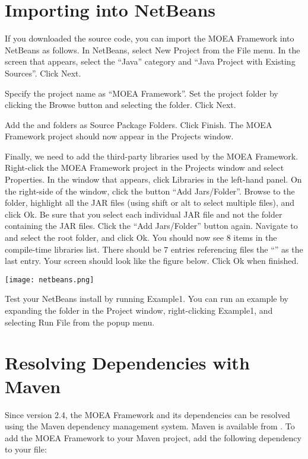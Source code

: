 \section{Importing into NetBeans}
If you downloaded the source code, you can import the MOEA Framework into NetBeans as follows.  In NetBeans, select New Project from the File menu.  In the screen that appears, select the ``Java'' category and ``Java Project with Existing Sources''.  Click Next.

Specify the project name as ``MOEA Framework''.  Set the project folder by clicking the Browse button and selecting the \folder{\moeaframework} folder.  Click Next.

Add the  and  folders as Source Package Folders.  Click Finish.  The MOEA Framework project should now appear in the Projects window.

Finally, we need to add the third-party libraries used by the MOEA Framework.  Right-click the MOEA Framework project in the Projects window and select Properties.  In the window that appears, click Libraries in the left-hand panel.  On the right-side of the window, click the button ``Add Jars/Folder''.  Browse to the  folder, highlight all the JAR files (using shift or alt to select multiple files), and click Ok.  Be sure that you select each individual JAR file and not the folder containing the JAR files.  Click the ``Add Jars/Folder'' button again.  Navigate to and select the root \folder{\moeaframework} folder, and click Ok.  You should now see $8$ items in the compile-time libraries list.  There should be $7$ entries referencing  files the ``'' as the last entry.  Your screen should look like the figure below.  Click Ok when finished.

\begin{center}
  \texttt{[image: netbeans.png]}
\end{center}

Test your NetBeans install by running Example1.  You can run an example by expanding the  folder in the Project window, right-clicking Example1, and selecting Run File from the popup menu.

\section{Resolving Dependencies with Maven}
Since version 2.4, the MOEA Framework and its dependencies can be resolved using the Maven dependency management system.  Maven is available from .  To add the MOEA Framework to your Maven project, add the following dependency to your  file:

